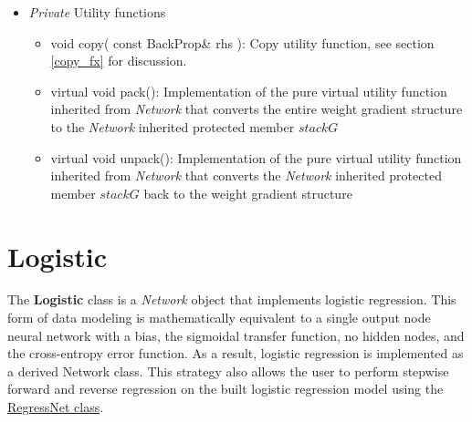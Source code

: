 \documentclass{report}
\begin{document}
\begin{itemize}
\begin{itemize}
      and {\em unpack}.  {\bf The weight update must therefore be taken
      from $Gradient$}, in batch/epoch mode as well as on-line.  Taking
      it from $WeightsAccumulate$ discards the search direction and
      silently reduces conjugate gradient descent and Shanno to plain
      gradient descent (corrected 2026-08-01; see
      \texttt{tests/backprop/check\_bpoptimizer.cpp}).
\item vector$<$ vector$<$ double $>$ $>$ $vpack$: per-layer holding
      vectors used by {\em unpack} to rebuild $Gradient$ from $stackG$
\item vector$<$ vector$<$ double $>$ $>$ $HOutputs$: vector containing
      a vector of outputs for each hidden layer
\item vector$<$ vector$<$ double $>$ $>$ $HErrors$: vector containing
      a vector of errors for each hidden layer
\end{itemize}

\item {\em Private} Utility functions

\begin{itemize}
\item void copy( const BackProp\& rhs ): Copy utility function, see
      section \ref{copy_fx} for discussion.
\item virtual void pack(): Implementation of the pure virtual utility
      function inherited from {\em Network} that converts the entire
      weight gradient structure to the {\em Network} inherited
      protected member $stackG$
\item virtual void unpack(): Implementation of the pure virtual
      utility function inherited from {\em Network} that converts the
      {\em Network} inherited protected member $stackG$ back to the
      weight gradient structure
\end{itemize}

\end{itemize}

\section{Logistic}

The {\bf Logistic} class is a {\em Network} object that implements
logistic regression. This form of data modeling is mathematically
equivalent to a single output node neural network with a bias, the
sigmoidal transfer function, no hidden nodes, and the cross-entropy
error function.  As a result, logistic regression is implemented as a
derived Network class.  This strategy also allows the user to perform
stepwise forward and reverse regression on the built logistic
regression model using the \hyperref[regressnet] {RegressNet class}.
\end{document}
